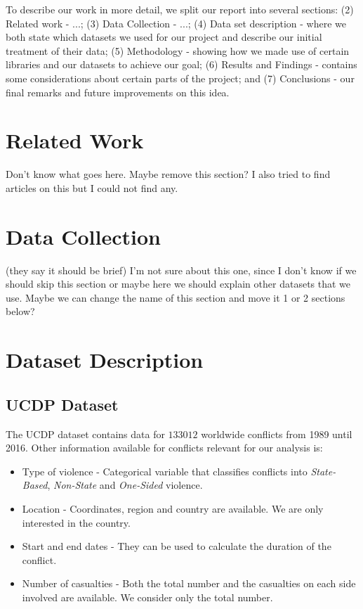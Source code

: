 \documentclass[11pt]{article}
\begin{document}
	To describe our work in more detail, we split our report into several sections: (2) Related work - ...; (3) Data Collection - ...; (4) Data set description - where we both state which datasets we used for our project and describe our initial treatment of their data; (5) Methodology - showing how we made use of certain libraries and our datasets to achieve our goal; (6) Results and Findings - contains some considerations about certain parts of the project; and (7) Conclusions - our final remarks and future improvements on this idea.
	
	\section{Related Work}
	Don't know what goes here. Maybe remove this section? I also tried to find
	articles on this but I could not find any.
	
	
	\section{Data Collection}
	(they say it should be brief) I'm not sure about this one, since I don't know if
	we should skip this section or maybe here we should explain other datasets that
	we use. Maybe we can change the name of this section and move it 1 or 2 sections
	below?
	
	
	\section{Dataset Description}
	\subsection{UCDP Dataset}
	\label{sub:ucdp_dataset}
	The UCDP dataset contains data for $133 012$ worldwide conflicts from 1989
	until 2016. Other information available for  conflicts relevant for our analysis
	is:
	\begin{itemize}
		\item Type of violence - Categorical variable that classifies conflicts into
		\emph{State-Based},  \emph{Non-State} and \emph{One-Sided} violence.
		\item Location - Coordinates, region and country are available. We are only
		interested in the country.
		\item Start and end dates - They can be used to calculate the duration of
		the conflict.
		\item Number of casualties - Both the total number and the casualties on
		each side involved are available. We consider only the total number.
	\end{itemize}
	
\end{document}
